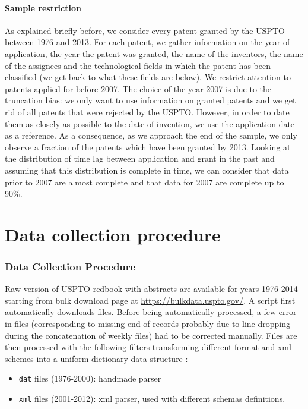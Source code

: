 \documentclass[article]{article}%
\begin{document}
\paragraph{Sample restriction}
As explained briefly before, we consider every patent granted by the USPTO between 1976 and 2013. For each patent, we gather information on the year of application, the year the patent was granted, the name of the inventors, the name of the assignees and the technological fields in which the patent has been classified (we get back to what these fields are below). We restrict attention to patents applied for before 2007. The choice of the year 2007 is due to the truncation bias: we only want to use information on granted patents and we get rid of all patents that were rejected by the USPTO. However, in order to date them as closely as possible to the date of invention, we use the application date as a reference. As a consequence, as we approach the end of the sample, we only observe a fraction of the patents which have been granted by 2013. Looking at the distribution of time lag between application and grant in the past and assuming that this distribution is complete in time, we can consider that data prior to 2007 are almost complete and that data for 2007 are complete up to 90\%.


\section{Data collection procedure}\label{app:datacollection}

\subsubsection*{Data Collection Procedure}

Raw version of USPTO redbook with abstracts are available for years 1976-2014 starting from bulk download page at \url{https://bulkdata.uspto.gov/}. A script first automatically downloads files. Before being automatically processed, a few error in files (corresponding to missing end of records probably due to line dropping during the concatenation of weekly files) had to be corrected manually. Files are then processed with the following filters transforming different format and xml schemes into a uniform dictionary data structure :

\begin{itemize}
\item \texttt{dat} files (1976-2000): handmade parser
\item \texttt{xml} files (2001-2012): xml parser, used with different schemas definitions.
\end{itemize}
\end{document}
